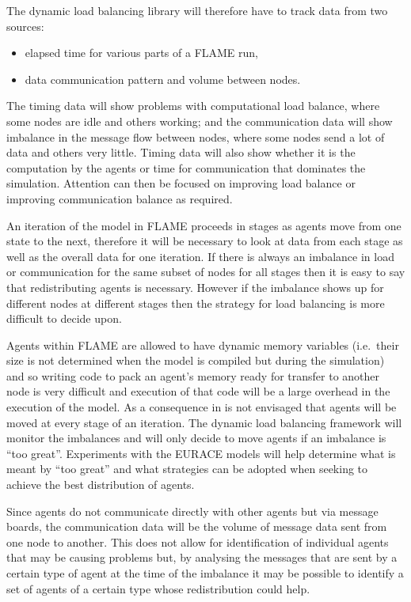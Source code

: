 The dynamic load balancing library will therefore have to track data from two sources:

\begin{itemize}
	\item elapsed time for various parts of a FLAME run,
	\item data communication pattern and volume between nodes.
\end{itemize}

The timing data will show problems with computational load balance, where some nodes are idle and others working; and the communication data will show imbalance in the message flow between nodes, where some nodes send a lot of data and others very little. Timing data will also show whether it is the computation by the agents or time for communication that dominates the simulation. Attention can then be focused on improving load balance or improving communication balance as required.

An iteration of the model in FLAME proceeds in stages as agents move from one state to the next, therefore it will be necessary to look at data from each stage as well as the overall data for one iteration. If there is always an imbalance in load or communication for the same subset of nodes for all stages then it is easy to say that redistributing agents is necessary. However if the imbalance shows up for different nodes at different stages then the strategy for load balancing is more difficult to decide upon. 

Agents within FLAME are allowed to have dynamic memory variables (i.e.\ their size is not determined when the model is compiled but during the simulation) and so writing code to pack an agent's memory ready for transfer to another node is very difficult and execution of that code will be a large overhead in the execution of the model. As a consequence in is not envisaged that agents will be moved at every stage of an iteration. The dynamic load balancing framework will monitor the imbalances and will only decide to move agents if an imbalance is ``too great''. Experiments with the EURACE models will help determine what is meant by ``too great'' and what strategies can be adopted when seeking to achieve the best distribution of agents.

Since agents do not communicate directly with other agents but via message boards, the communication data will be the volume of message data sent from one node to another. This does not allow for identification of individual agents that may be causing problems but, by analysing the messages that are sent by a certain type of agent at the time of the imbalance it may be possible to identify a set of agents of a certain type whose redistribution could help.

